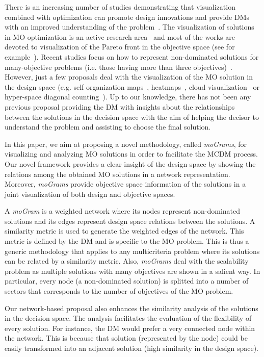 \documentclass[journal]{IEEEtran}
\begin{document}
There is an increasing number of studies demonstrating that visualization combined with optimization can promote design innovations and provide DMs with an improved understanding of the problem~\cite{Fleming05,Stump03}. The visualization of solutions in MO optimization is an active research area~\cite{Walker13,Tusar15} and most of the works are devoted to visualization of the Pareto front in the objective space (see for example~\cite{Lotov04,Kollat07,Kurasova13}). Recent studies focus on how to represent non-dominated solutions for many-objective problems (i.e. those having more than three objectives)~\cite{Walker13}.
However, just a few proposals deal with the visualization of the MO solution in the design space (e.g. self organization maps~\cite{Obayashi05}, heatmaps~\cite{Pryke07}, cloud visualization~\cite{Eddy02} or hyper-space diagonal counting~\cite{Agrawal04}). Up to our knowledge, there has not been any previous proposal providing the DM with insights about the relationships between the solutions in the decision space with the aim of helping the decisor to understand the problem and assisting to choose the final solution.



In this paper, we aim at proposing a novel methodology, called \emph{moGrams}, for visualizing and analyzing MO solutions in order to facilitate the MCDM process. Our novel framework provides a clear insight of the design space by showing the relations among the obtained MO solutions in a network representation. Moreover, \emph{moGrams} provide objective space information of the solutions in a joint visualization of both design and objective spaces.

A \emph{moGram} is a weighted network where its nodes represent non-dominated solutions and its edges represent design space relations between the solutions. A similarity metric is used to generate the weighted edges of the network. This metric is defined by the DM and is specific to the MO problem. This is thus a generic methodology that applies to any multicriteria problem where its solutions can be related by a similarity metric. Also, \emph{moGrams} deal with the scalability problem as multiple solutions with many objectives are shown in a salient way. In particular, every node (a non-dominated solution) is splitted into a number of sectors that corresponds to the number of objectives of the MO problem. 
 
Our network-based proposal also enhances the similarity analysis of the solutions in the decision space. The analysis facilitates the evaluation of the flexibility of every solution. For instance, the DM would prefer a very connected node within the network. This is because that solution (represented by the node) could be easily transformed into an adjacent solution (high similarity in the design space). 
\end{document}
